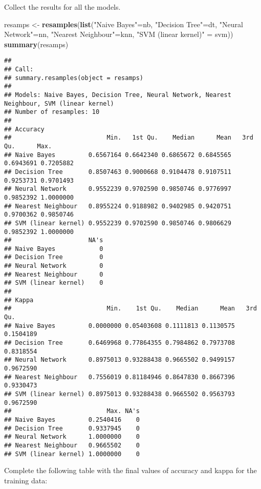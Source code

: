 \documentclass[]{article}
\newenvironment{Shaded}{\begin{snugshade}}{\end{snugshade}}
\newcommand{\KeywordTok}[1]{\textcolor[rgb]{0.13,0.29,0.53}{\textbf{#1}}}
\newcommand{\NormalTok}[1]{#1}
\newcommand{\StringTok}[1]{\textcolor[rgb]{0.31,0.60,0.02}{#1}}
\begin{document}
Collect the results for all the models.

\begin{Shaded}
\begin{Highlighting}[]
\NormalTok{resamps <-}\StringTok{ }\KeywordTok{resamples}\NormalTok{(}\KeywordTok{list}\NormalTok{(}\StringTok{"Naive Bayes"}\NormalTok{=nb,}
                          \StringTok{"Decision Tree"}\NormalTok{=dt,}
                          \StringTok{"Neural Network"}\NormalTok{=nn,}
                          \StringTok{"Nearest Neighbour"}\NormalTok{=knn,}
                          \StringTok{"SVM (linear kernel)"}\NormalTok{ =}\StringTok{ }\NormalTok{svm))}
\KeywordTok{summary}\NormalTok{(resamps)}
\end{Highlighting}
\end{Shaded}

\begin{verbatim}
## 
## Call:
## summary.resamples(object = resamps)
## 
## Models: Naive Bayes, Decision Tree, Neural Network, Nearest Neighbour, SVM (linear kernel) 
## Number of resamples: 10 
## 
## Accuracy 
##                          Min.   1st Qu.    Median      Mean   3rd Qu.      Max.
## Naive Bayes         0.6567164 0.6642340 0.6865672 0.6845565 0.6943691 0.7205882
## Decision Tree       0.8507463 0.9000668 0.9104478 0.9107511 0.9253731 0.9701493
## Neural Network      0.9552239 0.9702590 0.9850746 0.9776997 0.9852392 1.0000000
## Nearest Neighbour   0.8955224 0.9188982 0.9402985 0.9420751 0.9700362 0.9850746
## SVM (linear kernel) 0.9552239 0.9702590 0.9850746 0.9806629 0.9852392 1.0000000
##                     NA's
## Naive Bayes            0
## Decision Tree          0
## Neural Network         0
## Nearest Neighbour      0
## SVM (linear kernel)    0
## 
## Kappa 
##                          Min.    1st Qu.    Median      Mean   3rd Qu.
## Naive Bayes         0.0000000 0.05403608 0.1111813 0.1130575 0.1504189
## Decision Tree       0.6469968 0.77864355 0.7984862 0.7973708 0.8318554
## Neural Network      0.8975013 0.93288438 0.9665502 0.9499157 0.9672590
## Nearest Neighbour   0.7556019 0.81184946 0.8647830 0.8667396 0.9330473
## SVM (linear kernel) 0.8975013 0.93288438 0.9665502 0.9563793 0.9672590
##                          Max. NA's
## Naive Bayes         0.2540416    0
## Decision Tree       0.9337945    0
## Neural Network      1.0000000    0
## Nearest Neighbour   0.9665502    0
## SVM (linear kernel) 1.0000000    0
\end{verbatim}

Complete the following table with the final values of accuracy and kappa
for the training data:
\end{document}
